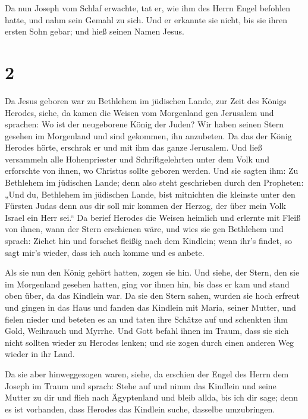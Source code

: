  Da nun Joseph vom Schlaf erwachte, tat er, wie ihm des
Herrn Engel befohlen hatte, und nahm sein Gemahl zu sich.
 Und er erkannte sie nicht, bis sie ihren ersten Sohn
gebar; und hieß seinen Namen Jesus.

\hypertarget{section-1}{%
\section{2}\label{section-1}}

 Da Jesus geboren war zu Bethlehem im jüdischen Lande, zur
Zeit des Königs Herodes, siehe, da kamen die Weisen vom Morgenland gen
Jerusalem und sprachen:  Wo ist der neugeborene König der
Juden? Wir haben seinen Stern gesehen im Morgenland und sind gekommen,
ihn anzubeten.  Da das der König Herodes hörte, erschrak
er und mit ihm das ganze Jerusalem.  Und ließ versammeln
alle Hohenpriester und Schriftgelehrten unter dem Volk und erforschte
von ihnen, wo Christus sollte geboren werden.  Und sie
sagten ihm: Zu Bethlehem im jüdischen Lande; denn also steht geschrieben
durch den Propheten:  „Und du, Bethlehem im jüdischen
Lande, bist mitnichten die kleinste unter den Fürsten Judas denn aus dir
soll mir kommen der Herzog, der über mein Volk Israel ein Herr sei.``
 Da berief Herodes die Weisen heimlich und erlernte mit
Fleiß von ihnen, wann der Stern erschienen wäre,  und wies
sie gen Bethlehem und sprach: Ziehet hin und forschet fleißig nach dem
Kindlein; wenn ihr's findet, so sagt mir's wieder, dass ich auch komme
und es anbete.

 Als sie nun den König gehört hatten, zogen sie hin. Und
siehe, der Stern, den sie im Morgenland gesehen hatten, ging vor ihnen
hin, bis dass er kam und stand oben über, da das Kindlein war.
 Da sie den Stern sahen, wurden sie hoch erfreut
 und gingen in das Haus und fanden das Kindlein mit
Maria, seiner Mutter, und fielen nieder und beteten es an und taten ihre
Schätze auf und schenkten ihm Gold, Weihrauch und Myrrhe.
 Und Gott befahl ihnen im Traum, dass sie sich nicht
sollten wieder zu Herodes lenken; und sie zogen durch einen anderen Weg
wieder in ihr Land.

 Da sie aber hinweggezogen waren, siehe, da erschien der
Engel des Herrn dem Joseph im Traum und sprach: Stehe auf und nimm das
Kindlein und seine Mutter zu dir und flieh nach Ägyptenland und bleib
allda, bis ich dir sage; denn es ist vorhanden, dass Herodes das
Kindlein suche, dasselbe umzubringen.

